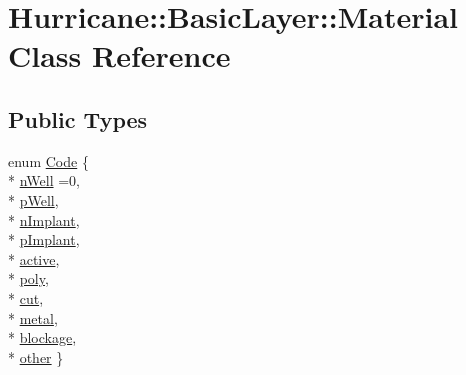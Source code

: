 \hypertarget{classHurricane_1_1BasicLayer_1_1Material}{\section{Hurricane\-:\-:Basic\-Layer\-:\-:Material Class Reference}
\label{classHurricane_1_1BasicLayer_1_1Material}
}
\subsection*{Public Types}
\begin{DoxyCompactItemize}
\item 
enum \hyperlink{classHurricane_1_1BasicLayer_1_1Material_a3e815440ad4b86b3569fa54ca06fc3e8}{Code} \{ \\*
\hyperlink{classHurricane_1_1BasicLayer_1_1Material_a3e815440ad4b86b3569fa54ca06fc3e8acdf0cf84e1b081113add657e0a8bd49c}{n\-Well} =0, 
\\*
\hyperlink{classHurricane_1_1BasicLayer_1_1Material_a3e815440ad4b86b3569fa54ca06fc3e8abab32187e9c4013a84e39cb6283bcc92}{p\-Well}, 
\\*
\hyperlink{classHurricane_1_1BasicLayer_1_1Material_a3e815440ad4b86b3569fa54ca06fc3e8ac4e1ac9fce1c8328c415aebc024d1fda}{n\-Implant}, 
\\*
\hyperlink{classHurricane_1_1BasicLayer_1_1Material_a3e815440ad4b86b3569fa54ca06fc3e8a73d7adbdda868d5e680a24ce3c20279e}{p\-Implant}, 
\\*
\hyperlink{classHurricane_1_1BasicLayer_1_1Material_a3e815440ad4b86b3569fa54ca06fc3e8ab67cfb3c192135ea8d52452a8932f7b7}{active}, 
\\*
\hyperlink{classHurricane_1_1BasicLayer_1_1Material_a3e815440ad4b86b3569fa54ca06fc3e8a506eb536d54e1005b664cc0f2c101670}{poly}, 
\\*
\hyperlink{classHurricane_1_1BasicLayer_1_1Material_a3e815440ad4b86b3569fa54ca06fc3e8ac853c14f5754c0d802b5be0f8068b4cf}{cut}, 
\\*
\hyperlink{classHurricane_1_1BasicLayer_1_1Material_a3e815440ad4b86b3569fa54ca06fc3e8a9f5ac52339b7bd9bbf7cdac468c51924}{metal}, 
\\*
\hyperlink{classHurricane_1_1BasicLayer_1_1Material_a3e815440ad4b86b3569fa54ca06fc3e8a0dd9279952186054fda92b8a97b253fd}{blockage}, 
\\*
\hyperlink{classHurricane_1_1BasicLayer_1_1Material_a3e815440ad4b86b3569fa54ca06fc3e8a43faff93bcb2788ccb23905cc0d07bec}{other}
 \}
\end{DoxyCompactItemize}



